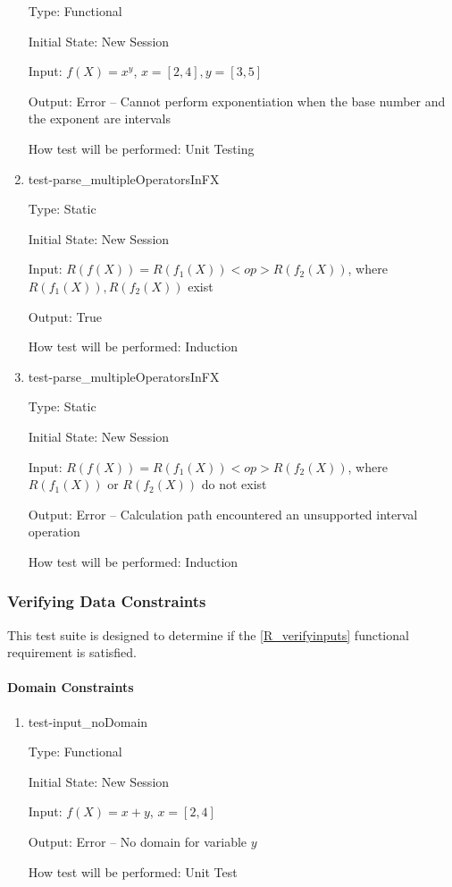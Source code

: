 \documentclass[12pt, titlepage]{article}
\begin{document}
\begin{enumerate}
	Type: Functional
	
	Initial State: New Session
	
	Input: $f(X) = x^y$, $x = [2,4], y = [3,5]$
	
	Output: Error -- Cannot perform exponentiation when the base number and the 
	exponent are intervals
	
	How test will be performed: Unit Testing\\
	
	\item{test-parse\_multipleOperatorsInFX}
	
	Type: Static
	
	Initial State: New Session
	
	Input: $R(f(X)) = R(f_1(X)) <op> R(f_2(X))$, where $R(f_1(X)), R(f_2(X))$ 
	exist
	
	Output: True
	
	How test will be performed: Induction\\
	
	\item{test-parse\_multipleOperatorsInFX}
	
	Type: Static
	
	Initial State: New Session
	
	Input: $R(f(X)) = R(f_1(X)) <op> R(f_2(X))$, where $R(f_1(X))$ or 
	$R(f_2(X))$ do not exist
	
	Output: Error -- Calculation path encountered an unsupported interval 
	operation
	
	How test will be performed: Induction\\
	
\end{enumerate}

\subsubsection{Verifying Data Constraints}
This test suite is designed to determine if the \ref{R_verifyinputs} functional 
requirement is satisfied.

\paragraph{Domain Constraints}

\begin{enumerate}
	
	\item{test-input\_noDomain}
	
	Type: Functional
	
	Initial State: New Session
	
	Input: $f(X) = x + y$, $x = [2,4]$
	
	Output: Error -- No domain for variable $y$
	
	How test will be performed: Unit Test\\
\end{enumerate}
\end{document}
